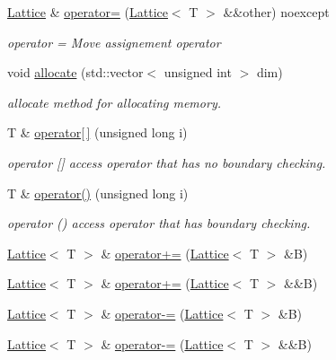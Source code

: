 \begin{DoxyCompactItemize}
\mbox{\hyperlink{class_lattice}{Lattice}} \& \mbox{\hyperlink{class_lattice_a29505c3ad95dc2695401c049cc34ba62}{operator=}} (\mbox{\hyperlink{class_lattice}{Lattice}}$<$ T $>$ \&\&other) noexcept
\begin{DoxyCompactList}\small\item\em operator = Move assignement operator \end{DoxyCompactList}\item 
void \mbox{\hyperlink{class_lattice_a5b4e162f06f7b4b90b4a9335ed2aabb5}{allocate}} (std\+::vector$<$ unsigned int $>$ dim)
\begin{DoxyCompactList}\small\item\em allocate method for allocating memory. \end{DoxyCompactList}\item 
T \& \mbox{\hyperlink{class_lattice_ab7d585cf03c540d70ff91a58facbdef5}{operator\mbox{[}$\,$\mbox{]}}} (unsigned long i)
\begin{DoxyCompactList}\small\item\em operator \mbox{[}\mbox{]} access operator that has no boundary checking. \end{DoxyCompactList}\item 
T \& \mbox{\hyperlink{class_lattice_ae588d401adbaab9889698b3e9c6e00b1}{operator()}} (unsigned long i)
\begin{DoxyCompactList}\small\item\em operator () access operator that has boundary checking. \end{DoxyCompactList}\item 
\mbox{\hyperlink{class_lattice}{Lattice}}$<$ T $>$ \& \mbox{\hyperlink{class_lattice_aa5eb9113987a4a411cd57245d591a458}{operator+=}} (\mbox{\hyperlink{class_lattice}{Lattice}}$<$ T $>$ \&B)
\item 
\mbox{\hyperlink{class_lattice}{Lattice}}$<$ T $>$ \& \mbox{\hyperlink{class_lattice_a83e9265a5da00384a19dc47eff5f9e00}{operator+=}} (\mbox{\hyperlink{class_lattice}{Lattice}}$<$ T $>$ \&\&B)
\item 
\mbox{\hyperlink{class_lattice}{Lattice}}$<$ T $>$ \& \mbox{\hyperlink{class_lattice_abc6ee1293f4490f34f96b85233b03ed1}{operator-\/=}} (\mbox{\hyperlink{class_lattice}{Lattice}}$<$ T $>$ \&B)
\item 
\mbox{\hyperlink{class_lattice}{Lattice}}$<$ T $>$ \& \mbox{\hyperlink{class_lattice_a814b798e40210ac2aed7cbd876625c30}{operator-\/=}} (\mbox{\hyperlink{class_lattice}{Lattice}}$<$ T $>$ \&\&B)
\item 

\end{DoxyCompactItemize}

